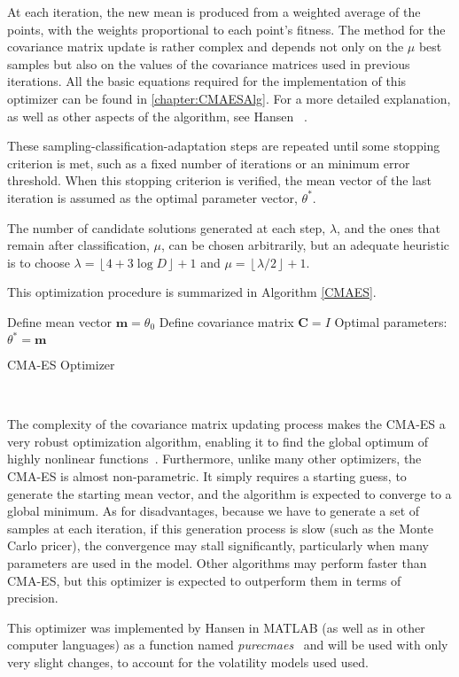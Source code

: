 At each iteration, the new mean is produced from a weighted average of the points, with the weights proportional to each point's fitness.
The method for the covariance matrix update is rather complex and depends not only on the $\mu$ best samples but also on the values of the covariance matrices used in previous iterations. All the basic equations required for the implementation of this optimizer can be found in \autoref{chapter:CMAESAlg}. For a more detailed explanation, as well as other aspects of the algorithm, see Hansen ~\citep{Hansen}.

These sampling-classification-adaptation steps are repeated until some stopping criterion is met, such as a fixed number of iterations or an minimum error threshold.
When this stopping criterion is verified, the mean vector of the last iteration is assumed as the optimal parameter vector, $\theta^{*}$.


The number of candidate solutions generated at each step, $\lambda$, and the ones that remain after classification, $\mu$, can be chosen arbitrarily, but an adequate heuristic is to choose $\lambda=\left\lfloor4+3\log D\right\rfloor+1$ and $\mu=\left\lfloor\lambda/2\right\rfloor+1$.

This optimization procedure is summarized in Algorithm \ref{CMAES}.

\begin{algorithm}[H]\label{CMAES}
\DontPrintSemicolon
Define mean vector $\mathbf{m}=\theta_0$
Define covariance matrix $\mathbf{C}=I$\;
 Optimal parameters: $\theta^{*}=\mathbf{m}$\;
 \caption{CMA-ES Optimizer}
\end{algorithm}
\

The complexity of the covariance matrix updating process makes the CMA-ES a very robust optimization algorithm, enabling it to find the global optimum of highly nonlinear functions~\citep{DilaoCMA}.
Furthermore, unlike many other optimizers, the CMA-ES is almost non-parametric. It simply requires a starting guess, to generate the starting mean vector, and the algorithm is expected to converge to a global minimum.
As for disadvantages, because we have to generate a set of samples at each iteration, if this generation process is slow (such as the Monte Carlo pricer), the convergence may stall significantly, particularly when many parameters are used in the model. Other algorithms may perform faster than CMA-ES, but this optimizer is expected to outperform them in terms of precision.

This optimizer was implemented by Hansen in MATLAB (as well as in other computer languages) as a function named \emph{purecmaes}~\citep{CMAES} and will be used with only very slight changes, to account for the volatility models used used.

